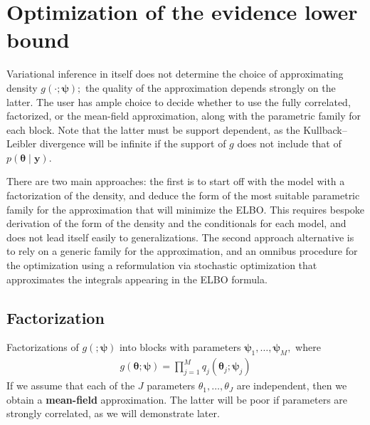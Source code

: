 \documentclass[
  11pt,
  letterpaper,
]{scrbook}
\theoremstyle{definition}
\theoremstyle{definition}
\theoremstyle{definition}
\theoremstyle{plain}
\theoremstyle{plain}
\theoremstyle{plain}
\theoremstyle{remark}
\begin{document}
\section{Optimization of the evidence lower
bound}\label{optimization-of-the-evidence-lower-bound}

Variational inference in itself does not determine the choice of
approximating density \(g(\cdot; \boldsymbol{\psi});\) the quality of
the approximation depends strongly on the latter. The user has ample
choice to decide whether to use the fully correlated, factorized, or the
mean-field approximation, along with the parametric family for each
block. Note that the latter must be support dependent, as the
Kullback--Leibler divergence will be infinite if the support of \(g\)
does not include that of \(p(\boldsymbol{\theta} \mid \boldsymbol{y}).\)

There are two main approaches: the first is to start off with the model
with a factorization of the density, and deduce the form of the most
suitable parametric family for the approximation that will minimize the
ELBO. This requires bespoke derivation of the form of the density and
the conditionals for each model, and does not lead itself easily to
generalizations. The second approach alternative is to rely on a generic
family for the approximation, and an omnibus procedure for the
optimization using a reformulation via stochastic optimization that
approximates the integrals appearing in the ELBO formula.

\subsection{Factorization}\label{factorization}

Factorizations of \(g(;\boldsymbol{\psi})\) into blocks with parameters
\(\boldsymbol{\psi}_1, \ldots, \boldsymbol{\psi}_M,\) where
\begin{align*}
g(\boldsymbol{\theta}; \boldsymbol{\psi}) = \prod_{j=1}^M q_j(\boldsymbol{\theta}_j; \boldsymbol{\psi}_j)
\end{align*} If we assume that each of the \(J\) parameters
\(\theta_1, \ldots, \theta_J\) are independent, then we obtain a
\textbf{mean-field} approximation. The latter will be poor if parameters
are strongly correlated, as we will demonstrate later.
\end{document}
